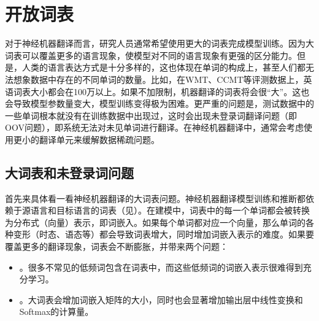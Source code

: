
\section{开放词表}

\parinterval 对于神经机器翻译而言，研究人员通常希望使用更大的词表完成模型训练。因为大词表可以覆盖更多的语言现象，使模型对不同的语言现象有更强的区分能力。但是，人类的语言表达方式是十分多样的，这也体现在单词的构成上，甚至人们都无法想象数据中存在的不同单词的数量。比如，在WMT、CCMT等评测数据上，英语词表大小都会在100万以上。如果不加限制，机器翻译的词表将会很“大”。这也会导致模型参数量变大，模型训练变得极为困难。更严重的问题是，测试数据中的一些单词根本就没有在训练数据中出现过，这时会出现未登录词翻译问题（即OOV问题），即系统无法对未见单词进行翻译。在神经机器翻译中，通常会考虑使用更小的翻译单元来缓解数据稀疏问题。


\subsection{大词表和未登录词问题}

\parinterval 首先来具体看一看神经机器翻译的大词表问题。神经机器翻译模型训练和推断都依赖于源语言和目标语言的词表（见{\chapterten}）。在建模中，词表中的每一个单词都会被转换为分布式（向量）表示，即词嵌入。如果每个单词都对应一个向量，那么单词的各种变形（时态、语态等）都会导致词表增大，同时增加词嵌入表示的难度。如果要覆盖更多的翻译现象，词表会不断膨胀，并带来两个问题：

\begin{itemize}
\vspace{0.5em}
\item {\small{}}。很多不常见的低频词包含在词表中，而这些低频词的词嵌入表示很难得到充分学习。
\vspace{0.5em}
\item {\small{}}。大词表会增加词嵌入矩阵的大小，同时也会显著增加输出层中线性变换和Softmax的计算量。
\vspace{0.5em}
\end{itemize}

